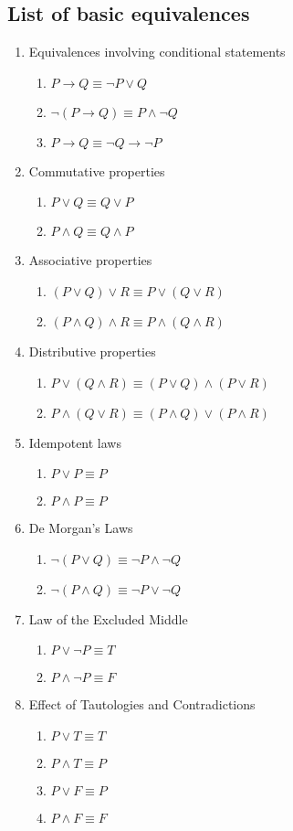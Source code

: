 \documentclass[12pt]{article}
\begin{document}
\subsection*{List of basic equivalences}
\begin{enumerate}
\item Equivalences involving conditional statements
\begin{enumerate}
 \item $P\to Q\equiv \neg P\vee Q$
 \item $\neg (P\to Q)\equiv P\wedge \neg Q$
 \item $P\to Q\equiv \neg Q\to \neg P$
\end{enumerate}
\item Commutative properties
\begin{enumerate}
\item $P \vee Q \equiv Q\vee P$
\item $P \wedge Q \equiv Q \wedge P$
\end{enumerate}
\item Associative properties
\begin{enumerate}
\item $(P\vee Q)\vee R \equiv P\vee (Q\vee R)$
\item $(P\wedge Q)\wedge R \equiv P\wedge (Q\wedge R)$
\end{enumerate}
\item Distributive properties
\begin{enumerate}
\item $P\vee (Q\wedge R) \equiv (P\vee Q)\wedge (P\vee R)$
\item $P\wedge (Q\vee R) \equiv (P\wedge Q)\vee (P\wedge R)$
\end{enumerate} 
\item Idempotent laws
\begin{enumerate}
\item $P \vee P \equiv P$
\item $P\wedge P \equiv P$
\end{enumerate}
\item De Morgan's Laws
\begin{enumerate}
\item $\neg (P\vee Q)\equiv \neg P \wedge \neg Q$
\item $\neg (P\wedge Q) \equiv \neg P \vee \neg Q$
\end{enumerate}
\item Law of the Excluded Middle
\begin{enumerate}
 \item $P\vee \neg P \equiv T$
 \item $P\wedge \neg P \equiv F$
\end{enumerate}
\item Effect of Tautologies and Contradictions
\begin{enumerate}
 \item $P\vee T \equiv T$
\item $P\wedge T \equiv P$
\item $P\vee F\equiv P$
\item $P\wedge F \equiv F$
\end{enumerate}
\end{enumerate}
\end{document}
